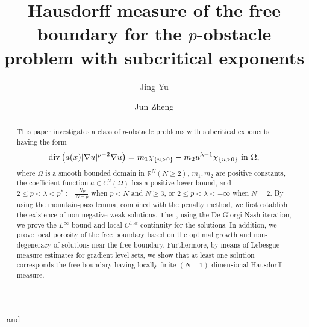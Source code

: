 \documentclass[onecolumn]{autart}
\begin{document}
%
\begin{frontmatter}

\title{Hausdorff measure of the free boundary for the $p$-obstacle problem with subcritical exponents} %


\author{Jing Yu}\ and 
\author{Jun Zheng}

\address{{School of Mathematics}, Southwest Jiaotong University, Chengdu, Sichuan 611756, P.~R.~of~China}  %


\begin{abstract}                           %
This paper investigates a class of $p$-obstacle  problems with subcritical exponents having the form
\begin{align}
	\mathrm{div}\left( a(x)|\nabla u|^{p-2}\nabla u\right) =m_1\chi_{\{u>0\}}-m_2u^{\lambda-1}\chi_{\{u>0\}} \ \text{in}\ \Omega,\notag
\end{align}
where $\Omega  $ is a smooth bounded domain in $ \mathbb{R}^N (N \geq 2)$,  $m_1,m_2$ are positive constants,   the coefficient function $a \in C^2(\Omega)$ has a positive lower bound, and $
2 \leq p < \lambda <p^*:= \frac{Np}{N-p}$ when    $p<N$ and $N \geq 3$, or
$2\leq p < \lambda <+\infty$ when $ N = 2$.
By using    the mountain-pass lemma, combined with the penalty method, we first establish the existence of non-negative weak solutions.  Then, using the De Giorgi-Nash iteration, we prove the $L^\infty$ bound and   local $C^{1,\alpha}$ continuity for the solutions. In addition, we prove local porosity of the free boundary based on the optimal growth and non-degeneracy of solutions near the free boundary.  Furthermore, by means of Lebesgue measure estimates for gradient level sets, we show that    at least one solution  corresponds the free boundary having locally finite $(N-1)$-dimensional Hausdorff measure.
\end{abstract}


\end{frontmatter}
\end{document}
